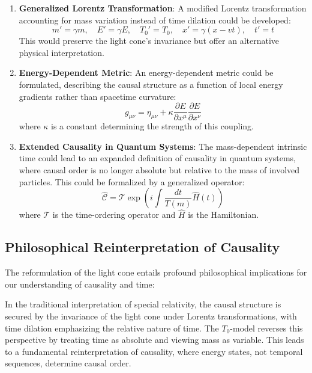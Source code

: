 \documentclass[a4paper,12pt]{article}
\begin{document}
	\begin{enumerate}
		\item \textbf{Generalized Lorentz Transformation}: A modified Lorentz transformation accounting for mass variation instead of time dilation could be developed:
		\begin{equation}
			m' = \gamma m, \quad E' = \gamma E, \quad T_0' = T_0, \quad x' = \gamma(x - vt), \quad t' = t
		\end{equation}
		This would preserve the light cone's invariance but offer an alternative physical interpretation.
		\item \textbf{Energy-Dependent Metric}: An energy-dependent metric could be formulated, describing the causal structure as a function of local energy gradients rather than spacetime curvature:
		\begin{equation}
			g_{\mu\nu} = \eta_{\mu\nu} + \kappa \frac{\partial E}{\partial x^\mu}\frac{\partial E}{\partial x^\nu}
		\end{equation}
		where \( \kappa \) is a constant determining the strength of this coupling.
		\item \textbf{Extended Causality in Quantum Systems}: The mass-dependent intrinsic time could lead to an expanded definition of causality in quantum systems, where causal order is no longer absolute but relative to the mass of involved particles. This could be formalized by a generalized operator:
		\begin{equation}
			\hat{\mathcal{C}} = \mathcal{T} \exp\left(i\int \frac{dt}{T(m)} \hat{H}(t)\right)
		\end{equation}
		where \( \mathcal{T} \) is the time-ordering operator and \( \hat{H} \) is the Hamiltonian.
	\end{enumerate}
	
	\subsection{Philosophical Reinterpretation of Causality}
	The reformulation of the light cone entails profound philosophical implications for our understanding of causality and time:
	
	In the traditional interpretation of special relativity, the causal structure is secured by the invariance of the light cone under Lorentz transformations, with time dilation emphasizing the relative nature of time. The \( T_0 \)-model reverses this perspective by treating time as absolute and viewing mass as variable. This leads to a fundamental reinterpretation of causality, where energy states, not temporal sequences, determine causal order.
	
\end{document}
